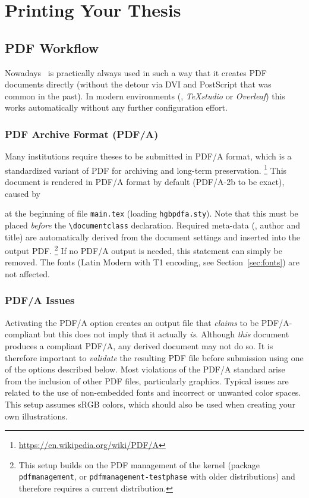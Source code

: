\chapter{Printing Your Thesis}
\label{cha:Printing}


\section{PDF Workflow}
\label{sec:pdf-workflow}

Nowadays \latex\ is practically always used in such a way that it creates PDF
documents directly (without the detour via DVI and PostScript that was common
in the past). In modern environments (\eg, \emph{TeXstudio} or \emph{Overleaf})
this works automatically without any further configuration effort.


\subsection{PDF Archive Format (PDF/A)}
\label{sec:PDFA}

Many institutions require theses to be submitted in PDF/A format, which is a
standardized variant of PDF for archiving and long-term preservation.%
\footnote{\url{https://en.wikipedia.org/wiki/PDF/A}}
This document is rendered in PDF/A format by default (PDF/A-2b to be exact),
caused by
%
\begin{LaTeXCode}[numbers=none]
\RequirePackage{hgbpdfa}
\end{LaTeXCode}
%
at the beginning of file \verb!main.tex! (loading \verb!hgbpdfa.sty!).
Note that this must be placed \emph{before} the \verb!\documentclass!
declaration. Required meta-data (\eg, author and title) are automatically 
derived from the document settings and inserted into the output PDF.%
\footnote{This setup builds on the PDF management of the \latex kernel (package
\texttt{pdfmanagement}, or \texttt{pdfmanagement-testphase} with older
distributions) and therefore requires a current \latex distribution.}
If no PDF/A output is needed, this statement can simply be removed. The fonts
(Latin Modern with T1 encoding, see Section~\ref{sec:fonts}) are not affected.


\subsection{PDF/A Issues}
\label{sec:PDFA-issues}

Activating the PDF/A option creates an output file that \emph{claims} to be 
PDF/A-compliant but this does not imply that it actually \emph{is}.
Although \emph{this} document produces a compliant PDF/A, any derived document
may not do so. It is therefore important to \emph{validate} the resulting PDF file
before submission using one of the options described below. Most violations
of the PDF/A standard arise from the inclusion of other PDF files, particularly 
graphics. Typical issues are related to the use of non-embedded fonts
and incorrect or unwanted color spaces. This setup assumes sRGB colors, 
which should also be used when creating your own illustrations.

